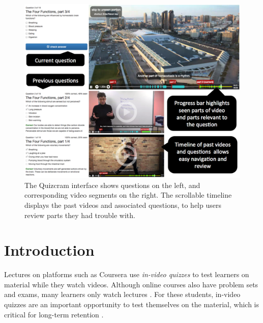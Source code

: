 \documentclass{sigchi}
\begin{document}


\begin{figure}
\centering
\includegraphics[width=1.0\columnwidth]{timeline-with-annotations}
\caption{The Quizcram interface shows questions on the left, and corresponding video segments on the right. The scrollable timeline displays the past videos and associated questions, to help users review parts they had trouble with.}
\label{fig:timeline}
\end{figure}

\section{Introduction}
Lectures on platforms such as Coursera use \emph{in-video quizzes} to test learners on material while they watch videos. Although online courses also have problem sets and exams, many learners only watch lectures \cite{anderson2014engaging} \cite{deconstructing}. For these students, in-video quizzes are an important opportunity to test themselves on the material, which is critical for long-term retention \cite{testingeffect}.
\end{document}
